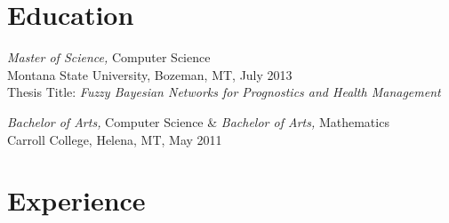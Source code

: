 \documentclass[line,margin]{res}
\begin{document}
\address{2226 Pacific Ave Apt E, Costa Mesa, CA 92627}
\address{(949) 293-4039 -  nick.ryhajlo@gmail.com}

 
\begin{resume}
 
\section{Education} {\sl Master of Science,} Computer Science \\
                Montana State University, Bozeman, MT, July 2013 \\
                Thesis Title: \textit{Fuzzy Bayesian Networks for Prognostics and Health Management}

				{\sl Bachelor of Arts,} Computer Science \& {\sl Bachelor of Arts,} Mathematics \\
                Carroll College, Helena, MT, 
                May 2011
                
\section{Experience}


\end{resume}
\end{document}
